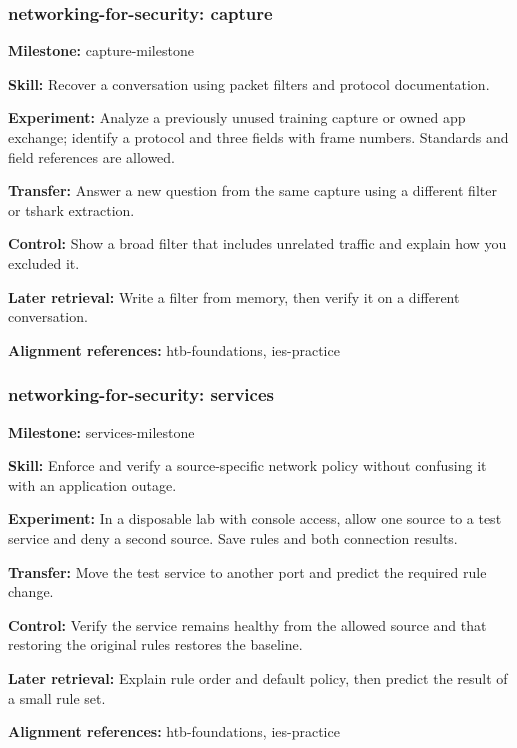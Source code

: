 \subsubsection{networking-for-security: capture}
\noindent\textbf{Milestone:} capture-milestone\par
\noindent\textbf{Skill:} Recover a conversation using packet filters and protocol documentation.\par
\noindent\textbf{Experiment:} Analyze a previously unused training capture or owned app exchange; identify a protocol and three fields with frame numbers. Standards and field references are allowed.\par
\noindent\textbf{Transfer:} Answer a new question from the same capture using a different filter or tshark extraction.\par
\noindent\textbf{Control:} Show a broad filter that includes unrelated traffic and explain how you excluded it.\par
\noindent\textbf{Later retrieval:} Write a filter from memory, then verify it on a different conversation.\par
\noindent\textbf{Alignment references:} htb-foundations, ies-practice\par
\subsubsection{networking-for-security: services}
\noindent\textbf{Milestone:} services-milestone\par
\noindent\textbf{Skill:} Enforce and verify a source-specific network policy without confusing it with an application outage.\par
\noindent\textbf{Experiment:} In a disposable lab with console access, allow one source to a test service and deny a second source. Save rules and both connection results.\par
\noindent\textbf{Transfer:} Move the test service to another port and predict the required rule change.\par
\noindent\textbf{Control:} Verify the service remains healthy from the allowed source and that restoring the original rules restores the baseline.\par
\noindent\textbf{Later retrieval:} Explain rule order and default policy, then predict the result of a small rule set.\par
\noindent\textbf{Alignment references:} htb-foundations, ies-practice\par
